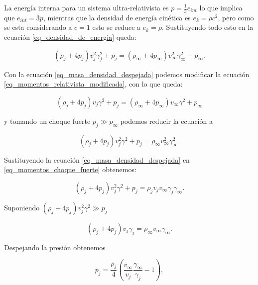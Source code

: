 \documentclass[12pt,a4paper]{book}
\begin{document}
\noindent La energía interna para un sistema ultra-relativista es $ p = \frac{1}{3}e_{int}$ lo que implica que $e_{int} = 3p$, mientras que la densidad de energía
cinética es $e_k = \rho c^2$, pero como se esta considerando a $c = 1$ esto se reduce a $e_k = \rho$. Sustituyendo todo esto en la ecuación
\ref{eq_densidad_de_energia} queda:

\begin{equation} \label{eq_momentos_relativista_modificada}
  \left( \rho_j + 4p_j \right) v^2_j \gamma^2_j  +p_j = \left( \rho_\infty + 4p_\infty \right) v^2_{\infty} \gamma^2_{\infty}  +p_\infty.
\end{equation}

\noindent Con la ecuación \ref{eq_masa_densidad_despejada} podemos modificar la ecuación \ref{eq_momentos_relativista_modificada}, con lo que queda:

\begin{equation}
  \left( \rho_j + 4p_j \right)v_j \gamma^2 +p_j = \left( \rho_\infty + 4p_\infty \right)v_\infty \gamma^2 +p_\infty
\end{equation}

\noindent y tomando un choque fuerte $p_j \gg p_\infty $ podemos reducir la ecuación a 

\begin{equation} \label{eq_momentos_choque_fuerte}
  \left( \rho_j + 4p_j \right)v_j^2 \gamma^2 +p_j =  \rho_\infty  v_\infty^2 \gamma_{\infty}^{2}. 
\end{equation}

\noindent Sustituyendo la ecuación \ref{eq_masa_densidad_despejada} en \ref{eq_momentos_choque_fuerte} obtenemos:

\begin{equation}
  \left( \rho_j + 4p_j \right)v_j^2 \gamma^2 +p_j = \rho_j v_j v_\infty \gamma_j \gamma_\infty.
\end{equation}

\noindent Suponiendo $\left( \rho_j + 4p_j \right)v_j^2 \gamma^2 \gg p_j $



\begin{equation}
  \left( \rho_j + 4p_j \right)v_j \gamma_j = \rho_\infty v_\infty  \gamma_\infty.
\end{equation}

\noindent Despejando la presión obtenemos

\begin{equation}
  p_j = \frac{\rho_j}{4}\left(\frac{v_\infty}{v_j} \frac{\gamma_\infty}{\gamma_j}-1\right),
\end{equation}
\end{document}
